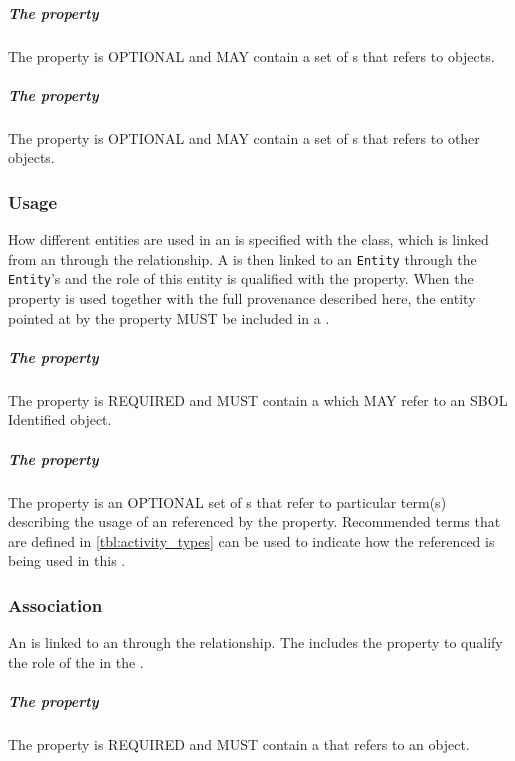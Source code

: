 \subparagraph{The  property}\label{sec:usages}
The  property is OPTIONAL and MAY contain a set of s that refers to  objects.

\subparagraph{The  property}\label{sec:wasInformedBys}
The  property is OPTIONAL and MAY contain a set of s that refers to other  objects.

\subsubsection{Usage}
\label{sec:Usage}
How different entities are used in an  is specified with the  class, which is linked from an  through the  relationship. A  is then linked to an \texttt{Entity} through the \texttt{Entity}'s  and the role of this entity is qualified with the  property. When the  property is used together with the full provenance described here, the entity pointed at by the  property MUST be included in a .

\subparagraph{The  property}\label{sec:entity}
The  property is REQUIRED and MUST contain a  which MAY refer to an SBOL Identified object.

\subparagraph{The  property}\label{sec:roles:U}
The  property is an OPTIONAL set of s that refer to particular term(s) describing the usage of an  referenced by the  property. Recommended terms that are defined in \ref{tbl:activity_types} can be used to indicate how the referenced  is being used in this .

\subsubsection{Association}
\label{sec:Association}
An  is linked to an  through the  relationship. The  includes the  property to qualify the role of the  in the .

\subparagraph{The  property}\label{sec:agent}
The  property is REQUIRED and MUST contain a  that refers to an  object.

